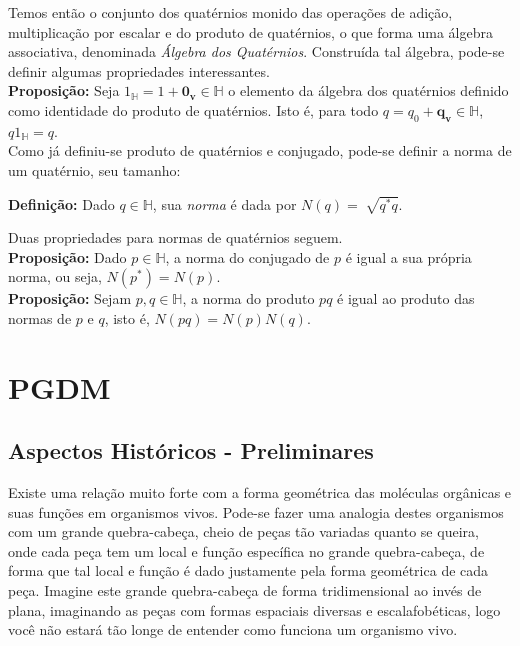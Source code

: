 \documentclass[a4paper,12pt]{article}
\begin{document}
	Temos então o conjunto dos quatérnios monido das operações de adição, multiplicação por escalar e do produto de quatérnios, o que forma uma álgebra associativa, denominada \textit{Álgebra dos Quatérnios}. Construída tal álgebra, pode-se definir algumas propriedades interessantes.
	\\
	
	\textbf{Proposição:} Seja $1_\mathbb{H} = 1 + \mathbf{0_v} \in \mathbb{H}$ o elemento da álgebra dos quatérnios definido como identidade do produto de quatérnios. Isto é, para todo $q = q_0 + \mathbf{q_v} \in \mathbb{H}$, $q1_\mathbb{H} = q$.
	\\
	
	Como já definiu-se produto de quatérnios e conjugado, pode-se definir a norma de um quatérnio, seu tamanho:
	
	\textbf{Definição:} Dado $q \in \mathbb{H}$, sua \textit{norma} é dada por $N(q) = \sqrt[]{q^*q}$. 
	
	Duas propriedades para normas de quatérnios seguem. 
	\\
	
	\textbf{Proposição:} Dado $p \in \mathbb{H}$, a norma do conjugado de $p$ é igual a sua própria norma, ou seja, $N(p^*) = N(p)$.
	\\
	
	\textbf{Proposição:} Sejam $p, q \in \mathbb{H}$, a norma do produto $pq$ é igual ao produto das normas de $p$ e $q$, isto é, $N(pq) = N(p)N(q)$.
	\\
	
	
	
	
	\newpage
	\section{PGDM}
	\subsection{Aspectos Históricos - Preliminares}
	Existe uma relação muito forte com a forma geométrica das moléculas orgânicas e suas funções em organismos vivos. Pode-se fazer uma analogia destes organismos com um grande quebra-cabeça, cheio de peças tão variadas quanto se queira, onde cada peça tem um local e função específica no grande quebra-cabeça, de forma que tal local e função é dado justamente pela forma geométrica de cada peça. Imagine este grande quebra-cabeça de forma tridimensional ao invés de plana, imaginando as peças com formas espaciais diversas e escalafobéticas, logo você não estará tão longe de entender como funciona um organismo vivo.
	
\end{document}
